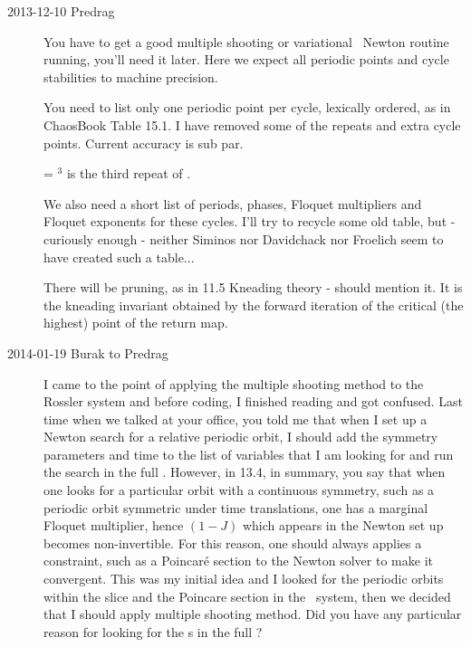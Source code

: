 \begin{description}


\item[2013-12-10 Predrag] You have to get a good multiple shooting
or variational \rpo\ Newton
routine running, you'll need it later. Here we expect all periodic
points and cycle stabilities to machine precision.

You need to list only one periodic point per cycle, lexically
ordered, as in ChaosBook
{Table 15.1}. I have removed some of the repeats and extra
cycle points. Current accuracy is sub par.

 = $^3$ is the third repeat of .

We also need a short list of periods, phases, Floquet multipliers
and Floquet exponents for these cycles. I'll try to recycle some
old table, but - curiously enough - neither Siminos nor Davidchack nor
Froelich seem to have created such a table...


There will be pruning, as in
{11.5 Kneading theory} - should mention it. It is the kneading invariant
obtained by the forward iteration of the critical (the highest) point of
the return map.

\item[2014-01-19 Burak to Predrag] I came to the point of applying the multiple
shooting method to the Rossler system and before coding, I finished reading
and got confused. Last time when we talked at your office, you told me that
when I set up a Newton search for a relative periodic orbit, I should add the
symmetry parameters and time to the list of variables that I am looking for
and run the search in the full \statesp . However, in 13.4, in summary, you
say that when one looks for a particular orbit with a continuous symmetry, such
as a periodic orbit symmetric under time translations, one has a marginal
Floquet multiplier, hence  $(1 - J)$ which appears in the Newton set up becomes
non-invertible. For this reason, one should always applies a constraint, such
as a Poincar\'e section to the Newton solver to make it convergent. This was
my initial idea and I looked for the periodic orbits within the slice and the
Poincare section in the \twoMode\ system, then we decided that I should apply
multiple shooting method. Did you have any particular reason for looking for the
\rpo s in the full \statesp ?


\end{description}
